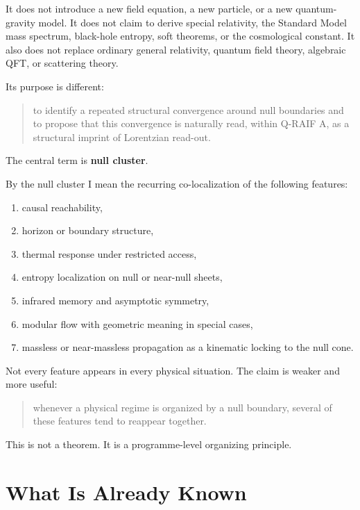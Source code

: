 \documentclass[12pt,a4paper]{article}
\theoremstyle{definition}
\theoremstyle{remark}
\newcommand{\tightlist}{%
  \setlength{\itemsep}{0pt}\setlength{\parskip}{0pt}}
\begin{document}
It does not introduce a new field equation, a new particle, or a new
quantum-gravity model. It does not claim to derive special relativity,
the Standard Model mass spectrum, black-hole entropy, soft theorems, or
the cosmological constant. It also does not replace ordinary general
relativity, quantum field theory, algebraic QFT, or scattering theory.

Its purpose is different:

\begin{quote}
to identify a repeated structural convergence around null boundaries and
to propose that this convergence is naturally read, within Q-RAIF A, as
a structural imprint of Lorentzian read-out.
\end{quote}

The central term is \textbf{null cluster}.

By the null cluster I mean the recurring co-localization of the
following features:

\begin{enumerate}[leftmargin=*]
\tightlist
\item
  causal reachability,
\item
  horizon or boundary structure,
\item
  thermal response under restricted access,
\item
  entropy localization on null or near-null sheets,
\item
  infrared memory and asymptotic symmetry,
\item
  modular flow with geometric meaning in special cases,
\item
  massless or near-massless propagation as a kinematic locking to the
  null cone.
\end{enumerate}

Not every feature appears in every physical situation. The claim is
weaker and more useful:

\begin{quote}
whenever a physical regime is organized by a null boundary, several of
these features tend to reappear together.
\end{quote}

This is not a theorem. It is a programme-level organizing principle.

\section{What Is Already Known}\label{what-is-already-known}
\end{document}
